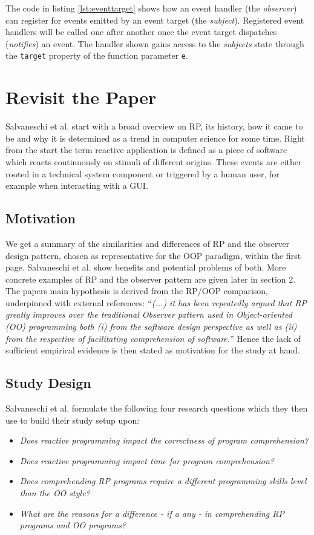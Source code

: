 \documentclass[12pt,a4paper]{article}
\begin{document}
The code in listing \ref{lst:eventtarget} shows how an event handler (the \emph{observer}) can register for events emitted by an event target (the \emph{subject}). Registered event handlers will be called one after another once the event target dispatches (\emph{notifies}) an event. The handler shown gains access to the \emph{subjects} state through the \texttt{target} property of the function parameter \texttt{e}.


\section{Revisit the Paper}

Salvaneschi et al. start with a broad overview on RP, its history, how it came to be and why it is determined as a trend in computer science for some time. Right from the start the term reactive application is defined as a piece of software which reacts continuously on stimuli of different origins. These events are either rooted in a technical system component or triggered by a human user, for example when interacting with a GUI.

\subsection{Motivation}
We get a summary of the similarities and differences of RP and the observer design pattern, chosen as representative for the OOP paradigm, within the first page. Salvaneschi et al. show benefits and potential problems of both. More concrete examples of RP and the observer pattern are given later in section 2. The papers main hypothesis is derived from the RP/OOP comparison, underpinned with external references: ``\emph{(...) it has been repeatedly argued that RP greatly improves over the traditional Observer pattern used in Object-oriented (OO) programming both (i) from the software design perspective as well as (ii) from the respective of facilitating comprehension of software.}'' Hence the lack of sufficient empirical evidence is then stated as motivation for the study at hand.

\subsection{Study Design}
Salvaneschi et al. formulate the following four research questions which they then use to build their study setup upon:

\begin{itemize}
	\item \emph{Does reactive programming impact the correctness of program comprehension?}
	\item \emph{Does reactive programming impact time for program comprehension?}
	\item \emph{Does comprehending RP programs require a different programming skills level than the OO style?}
	\item \emph{What are the reasons for a difference - if a any - in comprehending RP programs and OO programs?}
\end{itemize}
\end{document}
